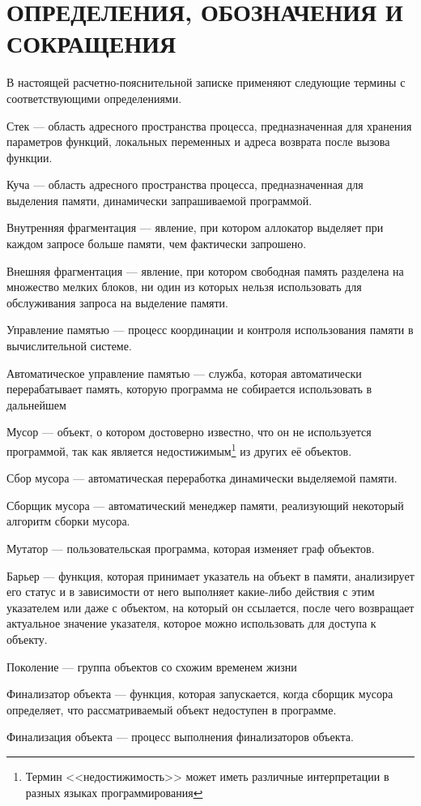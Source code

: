\part*{ОПРЕДЕЛЕНИЯ, ОБОЗНАЧЕНИЯ И\\СОКРАЩЕНИЯ}
В настоящей расчетно-пояснительной записке применяют следующие термины с соответствующими определениями.

\begin{enumdescript}
	\item[Стек] --- область адресного пространства процесса, предназначенная для хранения параметров функций, локальных переменных и адреса возврата после вызова функции.
	\item[Куча] --- область адресного пространства процесса, предназначенная для выделения памяти, динамически запрашиваемой программой.
	\item[Внутренняя фрагментация] --- явление, при котором аллокатор выделяет при каждом запросе больше памяти, чем фактически запрошено.
	\item[Внешняя фрагментация] --- явление, при котором свободная память разделена на множество мелких блоков, ни один из которых нельзя использовать для обслуживания запроса на выделение памяти.
	\item[Управление памятью] --- процесс координации и контроля использования памяти в вычислительной системе.
	\item[Автоматическое управление памятью] --- служба, которая автоматически перерабатывает память, которую программа не собирается использовать в дальнейшем
	\item[Мусор] --- объект, о котором достоверно известно, что он не используется программой, так как является недостижимым\footnote{Термин <<недостижимость>> может иметь различные интерпретации в разных языках программирования} из других её объектов.
	\item[Сбор мусора] --- автоматическая переработка динамически выделяемой памяти.
	\item[Сборщик мусора] --- автоматический менеджер памяти, реализующий некоторый алгоритм сборки мусора.
	\item[Мутатор] --- пользовательская программа, которая изменяет граф объектов.
	\item[Барьер] --- функция, которая принимает указатель на объект в памяти, анализирует его статус и в зависимости от него выполняет какие-либо действия с этим указателем или даже с объектом, на который он ссылается, после чего возвращает актуальное значение указателя, которое можно использовать для доступа к объекту.
	\item[Поколение] --- группа объектов со схожим временем жизни
	\item[Финализатор объекта] --- функция, которая запускается, когда сборщик мусора определяет, что рассматриваемый объект недоступен в программе.
	\item[Финализация объекта] --- процесс выполнения финализаторов объекта.
\end{enumdescript}
